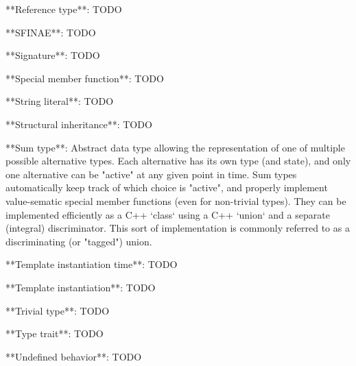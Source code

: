 **Reference type**: TODO

**SFINAE**: TODO

**Signature**: TODO

**Special member function**: TODO

**String literal**: TODO

**Structural inheritance**: TODO

**Sum type**: Abstract data type allowing the representation of one of multiple possible alternative types. Each alternative has its own type (and state), and only one alternative can be "active" at any given point in time. Sum types automatically keep track of which choice is "active", and properly implement value-sematic special member functions (even for non-trivial types). They can be implemented efficiently as a C++ `class` using a C++ `union` and a separate (integral) discriminator. This sort of implementation is commonly referred to as a discriminating (or "tagged") union.

**Template instantiation time**: TODO

**Template instantiation**: TODO

**Trivial type**: TODO

**Type trait**: TODO

**Undefined behavior**: TODO
